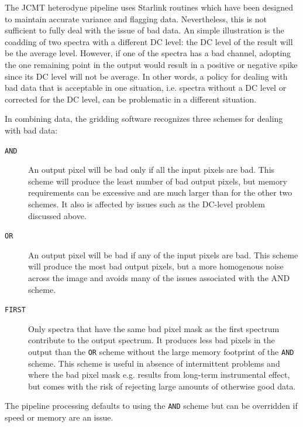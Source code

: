 \documentclass[final,authoryear,5p,times,twocolumn]{elsarticle}
\begin{document}
The JCMT heterodyne pipeline uses Starlink \citep[see
e.g.][]{2013ASPC..475..247B} routines which
have been designed to maintain accurate variance and flagging data.
Nevertheless, this is not sufficient to fully deal with the issue of
bad data. An simple illustration is the coadding of two spectra with a
different DC level: the DC level of the result will be the average
level. However, if one of the spectra has a bad channel, adopting the
one remaining point in the output would result in a positive or
negative spike since its DC level will not be average. In other words,
a policy for dealing with bad data that is acceptable in one situation,
i.e. spectra without a DC level or corrected for the DC level, can be
problematic in a different situation.

In combining data, the gridding software recognizes three schemes for
dealing with bad data:
\begin{description}
\item[\texttt{AND}] An output pixel will be bad only if all the input
   pixels are bad. This scheme will produce the least number of bad
   output pixels, but memory requirements can be excessive and are much
   larger than for the other two schemes. It also is affected by issues such
   as the DC-level problem discussed above.
\item[\texttt{OR}] An output pixel will be bad if any of the input
   pixels are bad. This scheme will produce the most bad output pixels,
   but a more homogenous noise across the image and avoids many
   of the issues associated with the AND scheme.
\item[\texttt{FIRST}] Only spectra that have the same bad pixel mask
   as the first spectrum contribute to the output spectrum. It
   produces less bad pixels in the output than the \texttt{OR}
   scheme without the large memory footprint of the \texttt{AND} scheme.
   This scheme is useful in absence of intermittent problems and where
   the bad pixel mask e.g. results from long-term instrumental effect, but
   comes with the risk of rejecting large amounts of otherwise good data. 
\end{description}

The pipeline processing defaults to using the \texttt{AND} scheme but
can be overridden if speed or memory are an issue.
\end{document}
